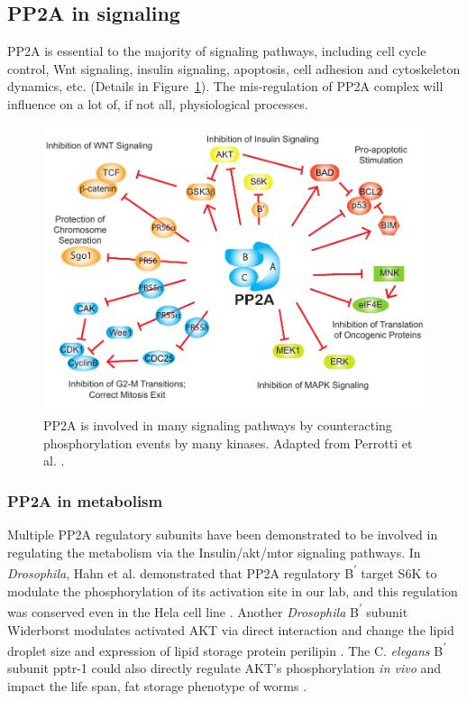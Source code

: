 \subsection{PP2A in signaling}

PP2A is essential to the majority of signaling pathways, including cell cycle control, Wnt signaling, insulin signaling, apoptosis, cell adhesion and cytoskeleton dynamics, etc. (Details in Figure~\ref{fig:fig1.1}). The mis-regulation of PP2A complex will influence on a lot of, if not all, physiological processes. 

\begin{figure}[!ht]
\centering
\includegraphics[width=1\textwidth]{figs/fig1-1 pp2a signaling.pdf}
\caption[PP2A in signaling]{\footnotesize PP2A is involved in many signaling pathways by counteracting phosphorylation events by many kinases. Adapted from Perrotti et al. \cite{perrotti_protein_2013}.}
\label{fig:fig1.1}
\end{figure}

\subsubsection{PP2A in metabolism}

Multiple PP2A regulatory subunits have been demonstrated to be involved in regulating the metabolism via the Insulin/\gls{akt}/\gls{mtor} signaling pathways. In \textit{Drosophila}, Hahn et al. demonstrated that PP2A regulatory B\textsuperscript{$\prime$} target S6K to modulate the phosphorylation of its activation site in our lab, and this regulation was conserved even in the Hela cell line \cite{hahn_pp2a_2010}. Another \textit{Drosophila} B\textsuperscript{$\prime$} subunit Widerborst modulates activated AKT via direct interaction and change the lipid droplet size and expression of lipid storage protein perilipin \cite{vereshchagina_protein_2008}. The C. \textit{elegans} B\textsuperscript{$\prime$} subunit pptr-1 could also directly regulate AKT's phosphorylation \textit{in vivo} and impact the life span, fat storage phenotype of worms \cite{padmanabhan_pp2a_2009}. 

